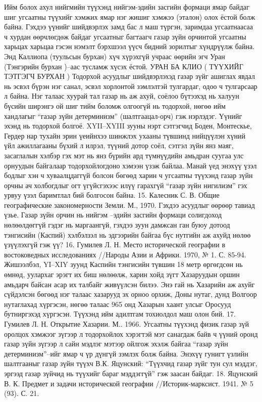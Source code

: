 Ийм болох ахул нийгмийн түүхэнд нийгэм-эдийн засгийн формаци ямар байдаг шиг угсаатны түүхийг хэмжих ямар нэг жишиг хэмжээ (эталон) олох ёстой болж байна. Гэхдээ үүнийг шийдвэрлэх замд бас л маш түргэн, заримдаа угсаатнаасаа ч хурдан өөрчлөгдөж байдаг угсаатныг багтаагч газар зүйн орчинтой угсаатны харьцах харьцаа гэсэн нэмэлт бэрхшээл үүсч бидний зорилтыг хүндрүүлж байна. Энд Каллиопа (туульсын бурхан) хүч хүрэхгүй учраас өөрийн эгч Уран (Тэнгэрийн бурхан )–аас тусламж хүсэх ёстой.
УРАН БА КЛИО ( ТҮҮХИЙГ ТЭТГЭГЧ БУРХАН )
Тодорхой асуудлыг шийдвэрлэхэд газар зүйг ашиглах явдал нь эсвэл бүрэн нэг санал, эсвэл хорлонтой зэмлэлтэй тулгардаг, одоо ч тулгарсаар л байна. Нэг талаас хуурай тал газар нь аж ахуй, соёлоо бүтээхэд нь халуун бүсийн ширэнгэ ой шиг тийм боломж олгоогүй нь тодорхой, нөгөө ийм хандлагыг “газар зүйн детерминизм” (шалтгаацал-орч) гэж нэрлэдэг.
Үүнийг эхэнд нь тодорхой болгоё. XYII–XYIII зууны нэрт сэтгэгчид Боден, Монтескье, Гердер нар тухайн эрин үеийнхээ шинжлэх ухааны түвшинд нийцүүлэн хүний үйл ажиллагааны бүхий л илрэл, түүний дотор соёл, сэтгэл зүйн янз маяг, засаглалын хэлбэр гэх мэт нь янз бүрийн ард түмнүүдийн амьдран суугаа улс орнуудын байгалаар тодорхойлогдоно хэмээн үзэж байлаа. Манай үед энэхүү үзэл бодлыг хэн ч хуваалцдаггүй болсон бөгөөд харин ч угсаатны түүхэнд газар зүйн орчны ач холбогдлыг огт үгүйсгэхээс илүү гарахгүй “газар зүйн нигилизм” гэх урвуу үзэл баримтлал бий болгосон байна. 15. Калесник С. В. Общие географические закономерности Земли. М., 1970.
Гэхдээ асуудлыг өөрөөр тавиад үзье. Газар зүйн орчин нь нийгэм –эдийн засгийн формаци солигдоход нөлөөлдөггүй гэдэг нь маргаангүй, гэхдээ зуун дамжсан ган буюу дотоод тэнгисийн (Каспий) хэлбэлзэл нь эдгээрийн байгаа бүс нутгийн аж ахуйд нөлөө үзүүлэхгүй гэж үү? 16. Гумилев Л. Н. Место исторической географии в востоковедных исследованиях //Народы Азии и Африки. 1970, № 1. С. 85-94.
Жишээлбэл, YI–XIY зуунд Каспийн тэнгисийн түвшин 18 метр өргөгдсөн нь өмнөд, уулархаг эрэгт их биш нөлөөлж, харин хойд зүгт Хазаруудын оршин амьдарч байсан асар их талбайг живүүлсэн билээ. Энэ гай нь Хазарийн аж ахуйг сүйдэлсэн бөгөөд нэг талаас хазарууд эх орноо орхиж, Доны нутаг, дунд Волгоор нутаглахад хүргэсэн, нөгөө талаас 965 онд Хазарын хаант улсыг Оросууд бутниргэхэд хүргэсэн. Түүхэнд ийм адилтгам тохиолдол маш олон бий. 17. Гумилев Л. Н. Открытие Хазарии. М.. 1966.
Угсаатны түүхэнд физик газар зүй оролцох хэмжээг зүгээр л тодорхойлох хэрэгтэй мэт санагдаж байв ч үүний оронд газар зүйн зүгээр л сайн мэдлэг мэтээр ойлгож эхэлж байгаа “газар зүйн детерминизм”–ийг ямар ч үр дүнгүй зэмлэх болж байна. Энэхүү гунигт үзлийн шалтгааныг газар зүйн түүхч В.К. Яцунский: “Түүхчид газар зүйг тун сул мэддэг, эргээд газар зүйчид нь түүхийг бараг мэддэггүй” гэж заасан байдаг. 18. Яцунский В. К. Предмет и задачи исторической географии //Историк-марксист. 1941. № 5 (93). С. 21.

